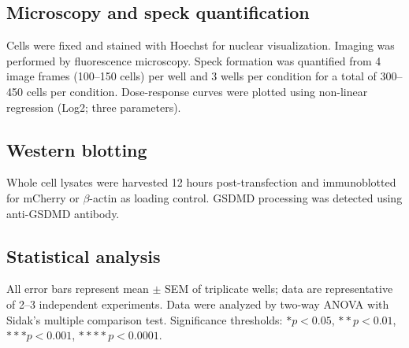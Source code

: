 \documentclass[11pt]{article}
\begin{document}
\subsection{Microscopy and speck quantification}
Cells were fixed and stained with Hoechst for nuclear visualization. Imaging was performed by fluorescence microscopy. Speck formation was quantified from 4 image frames (100--150 cells) per well and 3 wells per condition for a total of 300--450 cells per condition. Dose-response curves were plotted using non-linear regression (Log2; three parameters).

\subsection{Western blotting}
Whole cell lysates were harvested 12 hours post-transfection and immunoblotted for mCherry or $\beta$-actin as loading control. GSDMD processing was detected using anti-GSDMD antibody.

\subsection{Statistical analysis}
All error bars represent mean $\pm$ SEM of triplicate wells; data are representative of 2--3 independent experiments. Data were analyzed by two-way ANOVA with Sidak's multiple comparison test. Significance thresholds: $*p < 0.05$, $**p < 0.01$, $***p < 0.001$, $****p < 0.0001$.



\end{document}
